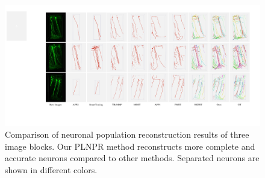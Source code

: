 \begin{figure}[t]
	\centering
	\includegraphics[width=1\textwidth]{./Illustrations/comparison_visor.pdf}
	\caption{Comparison of neuronal population reconstruction results of three image blocks. %
	Our PLNPR method reconstructs more complete and accurate neurons compared to other methods. Separated neurons are shown in different colors.
	}
	\label{fig:compare_VISoR}
\end{figure}

